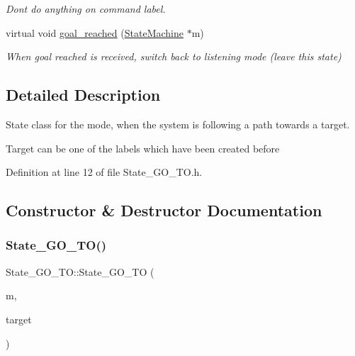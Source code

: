 \begin{DoxyCompactItemize}
\begin{DoxyCompactList}\small\item\em Don\textquotesingle{}t do anything on command label. \end{DoxyCompactList}\item 
virtual void \hyperlink{class_state___g_o___t_o_aefada4399e8bfdc2794a7bd4c3fdc065}{goal\+\_\+reached} (\hyperlink{class_state_machine}{State\+Machine} $\ast$m)
\begin{DoxyCompactList}\small\item\em When goal reached is received, switch back to listening mode (leave this state) \end{DoxyCompactList}\end{DoxyCompactItemize}


\subsection{Detailed Description}
State class for the mode, when the system is following a path towards a target. 

Target can be one of the labels which have been created before 

Definition at line 12 of file State\+\_\+\+G\+O\+\_\+\+T\+O.\+h.



\subsection{Constructor \& Destructor Documentation}
\mbox{\label{class_state___g_o___t_o_ad200bcfa107cbd4b1df514f074dcbf2d}} 
\subsubsection{\texorpdfstring{State\+\_\+\+G\+O\+\_\+\+T\+O()}{State\_GO\_TO()}}
{\footnotesize\ttfamily State\+\_\+\+G\+O\+\_\+\+T\+O\+::\+State\+\_\+\+G\+O\+\_\+\+TO (\begin{DoxyParamCaption}\item[{\hyperlink{class_state_machine}{State\+Machine} $\ast$}]{m,  }\item[{string}]{target }\end{DoxyParamCaption})}



